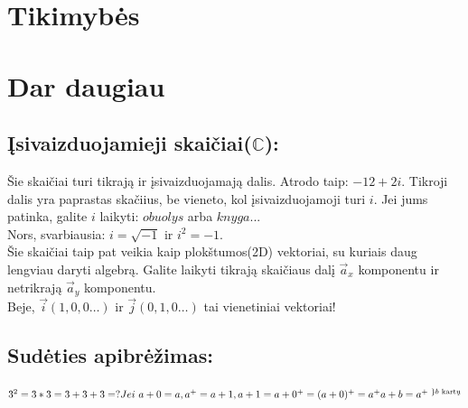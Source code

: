 \documentclass[fleqn]{article} %
\begin{document}


\section{Tikimybės}





\section{Dar daugiau}
\subsection{Įsivaizduojamieji skaičiai($\mathbb{C}$):}
Šie skaičiai turi tikrają ir įsivaizduojamają dalis. Atrodo taip: $-12 + 2i$.
Tikroji dalis yra paprastas skačiius, be vieneto, kol įsivaizduojamoji turi $i$. Jei jums patinka, galite $i$ laikyti: $obuolys$ arba $knyga$... \\
Nors, svarbiausia: $i = \sqrt{-1}$ ir $i^2 = -1$. \\
Šie skaičiai taip pat veikia kaip plokštumos(2D) vektoriai, su kuriais daug lengviau daryti algebrą. Galite laikyti tikrają skaičiaus dalį $\vec{a}_x$ komponentu ir netrikrają $\vec{a}_y$ komponentu. \\
Beje, $\vec{i}(1, 0, 0 \dots )$ ir $\vec{j}(0, 1, 0 \dots)$ tai vienetiniai vektoriai!



\subsection{Sudėties apibrėžimas:}
\begin{math}
    3^2 = 3 * 3 = 3 + 3 + 3 = ? \\
    \\
    Jei\ a + 0 = a, a^+ = a + 1, \\
    a + 1 = a + 0^+ = (a + 0)^+ = a^+ \\
    a + b = a^{+\ \}b \text{ kartų}}
\end{math} 
\end{document}
